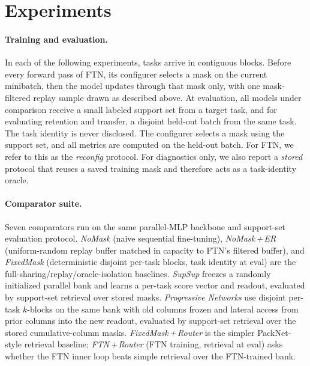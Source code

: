 \documentclass[11pt]{article}
\begin{document}
\section{Experiments}\label{sec:experiments}

\paragraph{Training and evaluation.}
In each of the following experiments, tasks arrive in contiguous blocks. Before every forward pass of FTN, its configurer selects a mask on the current minibatch, then the model updates through that mask only, with one mask-filtered replay sample drawn as described above. At evaluation, all models under comparison receive a small labeled support set from a target task, and for evaluating retention and transfer, a disjoint held-out batch from the same task. The task identity is never disclosed. The configurer selects a mask using the support set, and all metrics are computed on the held-out batch. For FTN, we refer to this as the \emph{reconfig} protocol. For diagnostics only, we also report a \emph{stored} protocol that reuses a saved training mask and therefore acts as a task-identity oracle.

\paragraph{Comparator suite.}
Seven comparators run on the same parallel-MLP backbone and support-set evaluation protocol. \emph{NoMask} (naive sequential fine-tuning), \emph{NoMask\,+\,ER} (uniform-random replay buffer matched in capacity to FTN's filtered buffer), and \emph{FixedMask} (deterministic disjoint per-task blocks, task identity at eval) are the full-sharing/replay/oracle-isolation baselines. \emph{SupSup} \citep{wortsman2020supermasks} freezes a randomly initialized parallel bank and learns a per-task score vector and readout, evaluated by support-set retrieval over stored masks. \emph{Progressive Networks} \citep{rusu2016progressive} use disjoint per-task $k$-blocks on the same bank with old columns frozen and lateral access from prior columns into the new readout, evaluated by support-set retrieval over the stored cumulative-column masks. \emph{FixedMask\,+\,Router} is the simpler PackNet-style retrieval baseline; \emph{FTN\,+\,Router} (FTN training, retrieval at eval) asks whether the FTN inner loop beats simple retrieval over the FTN-trained bank.
\end{document}
